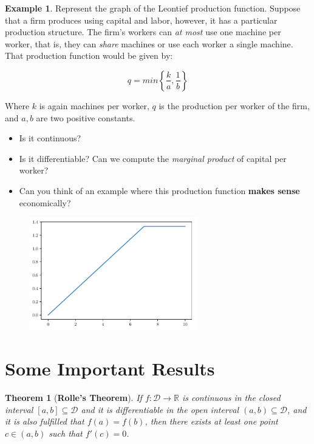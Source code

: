 \documentclass[a4paper,11pt]{article}
\theoremstyle{definition}
\newtheorem{example}{Example}
\theoremstyle{plain}
\newtheorem{theorem}{Theorem}
\begin{document}
\begin{example}
Represent the graph of the Leontief production
function. Suppose that a firm produces using capital and labor, however,
it has a particular production structure. The firm's workers can
\emph{at most} use one machine per worker, that is, they can
\emph{share} machines or use each worker a single machine. That
production function would be given by:

\[
q = min\left\{\frac{k}{a}, \frac{1}{b}\right\}
\]

Where \(k\) is again machines per worker, \(q\) is the production per
worker of the firm, and \(a,b\) are two positive constants.

\begin{itemize}
\item
  Is it continuous?
\item
  Is it differentiable? Can we compute the \emph{marginal product} of
  capital per worker?
\item
  Can you think of an example where this production function
  \textbf{makes sense} economically?
\end{itemize}

    \begin{figure}[htbp]
    	\centering 
    		\includegraphics[width = 0.65\textwidth]{Ch2_files/Ch2_15_0.pdf}
    \end{figure}

\end{example}
    
    \section{Some Important Results}\label{some-important-results}

\begin{theorem}[\textbf{Rolle's Theorem}]
If \(f:\mathcal{D}\rightarrow\mathbb{R}\) is continuous in the closed
interval \([a,b]\subseteq\mathcal{D}\) and it is differentiable in the
open interval \((a,b)\subseteq\mathcal{D}\), and it is also fulfilled
that \(f(a) = f(b)\), then there exists \emph{at least} one point
\(c\in(a,b)\) such that \(f'(c) = 0\).
\end{theorem}
\end{document}
